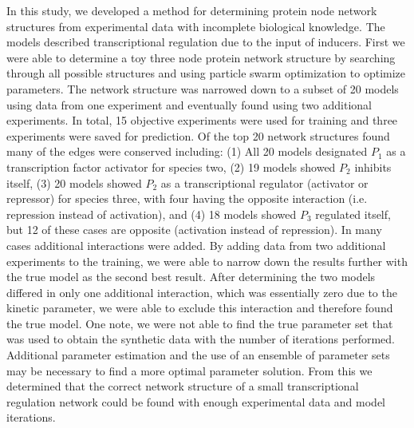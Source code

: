 \documentclass[12pt]{article}
\begin{document}
In this study, we developed a method for determining protein node network structures from experimental data with incomplete biological knowledge. 
The models described transcriptional regulation due to the input of inducers. 
First we were able to determine a toy three node protein network structure by searching through all possible structures and using particle swarm optimization to optimize parameters. 
The network structure was narrowed down to a subset of 20 models using data from one experiment and eventually found using two additional experiments. 
In total, 15 objective experiments were used for training and three experiments were saved for prediction. 
Of the top 20 network structures found many of the edges were conserved including: (1) All 20 models designated $P_{1}$ as a transcription factor activator for species two, (2) 19 models showed $P_{2}$ inhibits itself, (3) 20 models showed $P_{2}$ as a transcriptional regulator (activator or repressor) for species three, with four having the opposite interaction (i.e. repression instead of activation), and (4) 18 models showed $P_{3}$ regulated itself, but 12 of these cases are opposite (activation instead of repression). In many cases additional interactions were added. 
By adding data from two additional experiments to the training, we were able to narrow down the results further with the true model as the second best result. 
After determining the two models differed in only one additional interaction, which was essentially zero due to the kinetic parameter, we were able to exclude this interaction and therefore found the true model.
One note, we were not able to find the true parameter set that was used to obtain the synthetic data with the number of iterations performed.
Additional parameter estimation and the use of an ensemble of parameter sets may be necessary to find a more optimal parameter solution. 
From this we determined that the correct network structure of a small transcriptional regulation network could be found with enough experimental data and model iterations.
\end{document}
